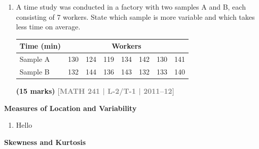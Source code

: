 \documentclass[12pt,a4paper]{article}
\newcommand{\yr}[1]{\hfill\textcolor{gray}{\small\textbf{[#1]}}}
\newcommand{\mk}[1]{\textcolor{orange!70!black}{\small\textbf{(#1 marks)}}}
\newcommand{\subtopic}[2]{%
  \vspace{10pt}
  \noindent\begin{tcolorbox}[colback=#1!8,colframe=#1,boxrule=0.6pt,arc=4pt,
    left=6pt,right=6pt,top=4pt,bottom=4pt]
    \small\bfseries\textcolor{#1}{#2}
  \end{tcolorbox}
  \vspace{2pt}
}
\begin{document}
\begin{enumerate}
\item A time study was conducted in a factory with two samples A and B, each consisting of 7 workers. State which sample is more variable and which takes less time on average.
\begin{center}
\begin{tabular}{lrrrrrrr}
\toprule
\textbf{Time (min)} & \multicolumn{7}{c}{Workers} \\
\midrule
Sample A & 130 & 124 & 119 & 134 & 142 & 130 & 141 \\
Sample B & 132 & 144 & 136 & 143 & 132 & 133 & 140 \\
\bottomrule
\end{tabular}
\end{center}
\mk{15} \yr{MATH 241 | L-2/T-1 | 2011--12}

\end{enumerate}

\subtopic{cG}{Measures of Location and Variability}
\label{sub:s7-measures}

\begin{enumerate}\item Hello \end{enumerate}

\subtopic{cG}{Skewness and Kurtosis}
\label{sub:s7-moments}
\end{document}
